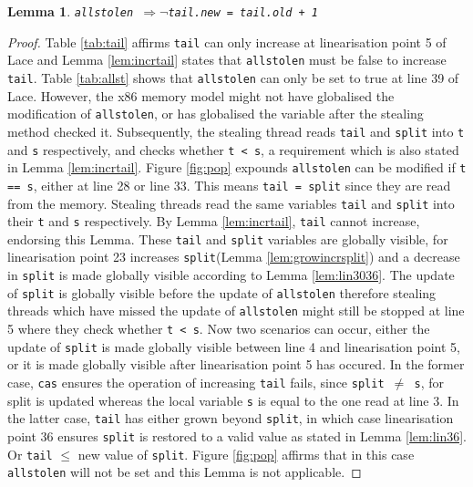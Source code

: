 \documentclass{sig-alternate-br}
\newtheorem{lemma}{Lemma}
\begin{document}
\begin{lemma}
	\texttt{allstolen $\Rightarrow \neg$tail.new = tail.old + 1}
	\label{lem:allst.incrtail}
\end{lemma}
\begin{proof}
	Table \ref{tab:tail} affirms \texttt{tail} can only increase at linearisation point 5 of Lace and Lemma \ref{lem:incrtail} states that \texttt{allstolen} must be false to increase \texttt{tail}.
	Table \ref{tab:allst} shows that \texttt{allstolen} can only be set to true at line 39 of Lace.	
	However, the x86 memory model might not have globalised the modification of \texttt{allstolen}, or has globalised the variable after the stealing method checked it.
	Subsequently, the stealing thread reads \texttt{tail} and \texttt{split} into \texttt{t} and \texttt{s} respectively, and checks whether \texttt{t < s}, a requirement which is also stated in Lemma \ref{lem:incrtail}.	
	Figure \ref{fig:pop} expounds \texttt{allstolen} can be modified if \texttt{t == s}, either at line 28 or line 33.
	This means \texttt{tail = split} since they are read from the memory.
	Stealing threads read the same variables \texttt{tail} and \texttt{split} into their \texttt{t} and \texttt{s} respectively.
	By Lemma \ref{lem:incrtail}, \texttt{tail} cannot increase, endorsing this Lemma.
	These \texttt{tail} and \texttt{split} variables are globally visible, for linearisation point 23 increases \texttt{split}(Lemma \ref{lem:growincrsplit}) and a decrease in \texttt{split} is made globally visible according to Lemma \ref{lem:lin3036}.
	The update of \texttt{split} is globally visible before the update of \texttt{allstolen} therefore stealing threads which have missed the update of \texttt{allstolen} might still be stopped at line 5 where they check whether \texttt{t < s}.	
	Now two scenarios can occur, either the update of \texttt{split} is made globally visible between line 4 and linearisation point 5, or it is made globally visible after linearisation point 5 has occured.
	In the former case, \texttt{cas} ensures the operation of increasing \texttt{tail} fails, since \texttt{split $\neq$ s}, for split is updated whereas the local variable \texttt{s} is equal to the one read at line 3.
	In the latter case, \texttt{tail} has either grown beyond \texttt{split}, in which case linearisation point 36 ensures \texttt{split} is restored to a valid value as stated in Lemma \ref{lem:lin36}.
	Or \texttt{tail} $\leq$ new value of \texttt{split}.
	Figure \ref{fig:pop} affirms that in this case \texttt{allstolen} will not be set and this Lemma is not applicable.
\end{proof}
\end{document}
